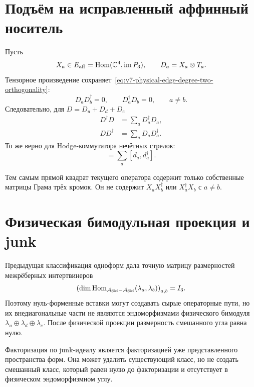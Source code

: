 \section{Подъём на исправленный аффинный носитель}

Пусть
\begin{equation}
 X_a\in E_{\rm aff}=\operatorname{Hom}(\mathbb C^4,\operatorname{im}P_3),
 \qquad
 D_a=X_a\otimes T_a.
 \label{eq:v7-lifted-edge-arrows}
\end{equation}
Тензорное произведение сохраняет~\eqref{eq:v7-physical-edge-degree-two-orthogonality}:
\begin{equation}
 D_aD_b^\dagger=0,
 \qquad
 D_a^\dagger D_b=0,
 \qquad a\ne b.
 \label{eq:v7-lifted-degree-two-cross-zero}
\end{equation}
Следовательно, для $D=D_u+D_d+D_e$
\begin{align}
 D^\dagger D&=\sum_aD_a^\dagger D_a,\label{eq:v7-source-square-sum}\\
 DD^\dagger&=\sum_aD_aD_a^\dagger.\label{eq:v7-target-square-sum}
\end{align}
То же верно для Hodge-коммутатора нечётных стрелок:
\begin{equation}
 [d,d^\dagger]=\sum_a[d_a,d_a^\dagger].
 \label{eq:v7-hodge-commutator-edge-sum}
\end{equation}

Тем самым прямой квадрат текущего оператора содержит только собственные
матрицы Грама трёх кромок. Он не содержит $X_aX_b^\dagger$ или
$X_a^\dagger X_b$ с $a\ne b$.

\section{Физическая бимодульная проекция и junk}

Предыдущая классификация одноформ дала точную матрицу размерностей
межрёберных интертвинеров
\begin{equation}
 \left(\dim\operatorname{Hom}_{\mathcal A_{\rm SM}-\mathcal A_{\rm SM}}
 (\lambda_a,\lambda_b)\right)_{a,b}
 =I_3.
 \label{eq:v7-edge-intertwiner-identity}
\end{equation}
Поэтому нуль-форменные вставки могут создавать сырые операторные пути, но
их внедиагональные части не являются эндоморфизмами физического
бимодуля $\lambda_u\oplus\lambda_d\oplus\lambda_e$. После физической
проекции размерность смешанного угла равна нулю.

Факторизация по junk-идеалу является факторизацией уже представленного
пространства форм. Она может удалить существующий класс, но не создать
смешанный класс, который равен нулю до факторизации и отсутствует в
физическом эндоморфизмном углу.

